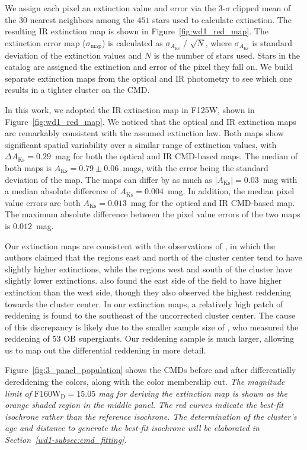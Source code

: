 \documentclass[12pt]{ucsddissertation}
\newcommand{\AKs}{A_{\mathrm{Ks}}}
\begin{document}
\begin{CJK*}{UTF8}{gbsn}
We assign each pixel an extinction value and error via the $3$-$\sigma$ clipped mean of the $30$ nearest neighbors among the $451$ stars used to calculate extinction. The resulting IR extinction map is shown in Figure~\ref{fig:wd1_red_map}. 
The extinction error map ($\sigma_{\mathrm{map}}$) is calculated as $\sigma_{\AKs}$ / $\sqrt{N}$, where $\sigma_{\AKs}$ is standard deviation of the extinction values and $N$ is the number of stars used. Stars in the catalog are assigned the extinction and error of the pixel they fall on. We build separate extinction maps from the optical and IR photometry to see which one results in a tighter cluster on the CMD.

In this work, we adopted the IR extinction map in F125W, shown in Figure~\ref{fig:wd1_red_map}. We noticed that the optical and IR extinction maps are remarkably consistent with the assumed extinction law. Both maps show significant spatial variability over a similar range of extinction values, with $\Delta\AKs = 0.29$~mag for both the optical and IR CMD-based maps. The median of both maps is $\AKs=0.79 \pm 0.06$~mags, with the error being the standard deviation of the map. The maps can differ by as much as $\vert\AKs\vert=0.03$~mag with a median absolute difference of $\AKs = 0.004$~mag. In addition, the median pixel value errors are both $\AKs = 0.013$~mag for the optical and IR CMD-based map. The maximum absolute difference between the pixel value errors of the two maps is $0.012$~mag. 

Our extinction maps are consistent with the observations of \citet{Brandner-2008}, in which the authors claimed that the regions east and north of the cluster center tend to have slightly higher extinctions, while the regions west and south of the cluster have slightly lower extinctions. \citet{Lim-2013} also found the east side of the field to have higher extinction than the west side, though they also observed the highest reddening towards the cluster center. In our extinction maps, a relatively high patch of reddening is found to the southeast of the uncorrected cluster center. The cause of this discrepancy is likely due to the smaller sample size of \citet{Lim-2013}, who measured the reddening of $53$ OB supergiants. Our reddening sample is much larger, allowing us to map out the differential reddening in more detail.

Figure~\ref{fig:3_panel_population} shows the CMDs before and after differentially dereddening the colors, along with the color membership cut. \textit{The magnitude limit of $\mathrm{F160W}_\mathrm{D} = 15.05$ mag for deriving the extinction map is shown as the orange shaded region in the middle panel. The red curves indicate the best-fit isochrone rather than the reference isochrone. The determination of the cluster's age and distance to generate the best-fit isochrone will be elaborated in Section~\ref{wd1-subsec:cmd_fitting}.}



\end{CJK*}
\end{document}
